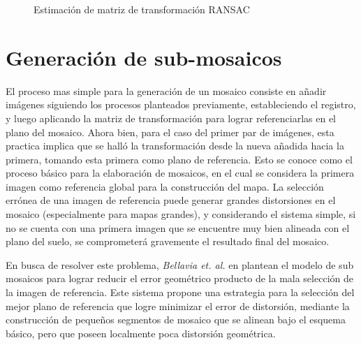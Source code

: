 \begin{figure}[hb]
	\centering
	\begin{minipage}{\linewidth}
		\begin{algorithm}[H] %
			\caption{Estimación de matriz de transformación RANSAC}
			\label{ransac}
			\SetAlgoLined
		\end{algorithm}
	\end{minipage}
\end{figure}



\section{Generación de sub-mosaicos}

El proceso mas simple para la generación de un mosaico consiste en añadir imágenes siguiendo los procesos planteados previamente, estableciendo el registro, y luego aplicando la matriz de transformación para lograr referenciarlas en el plano del mosaico. Ahora bien, para el caso del primer par de imágenes, esta practica implica que se halló la transformación desde la nueva añadida hacia la primera, tomando esta primera como plano de referencia. Esto se conoce como el proceso básico para la elaboración de mosaicos, en el cual se considera la primera imagen como referencia global para la construcción del mapa. La selección errónea de una imagen de referencia puede generar grandes distorsiones en el mosaico (especialmente para mapas grandes), y considerando el sistema simple, si no se cuenta con una primera imagen que se encuentre muy bien alineada con el plano del suelo, se comprometerá gravemente el resultado final del mosaico.

En busca de resolver este problema, \textit{Bellavia et. al.} en \cite{bellavia-ref,bellavia-ransac} plantean el modelo de sub mosaicos para lograr reducir el error geométrico producto de la mala selección de la imagen de referencia. Este sistema propone una estrategia para la selección del mejor plano de referencia que logre minimizar el error de distorsión, mediante la construcción de pequeños segmentos de mosaico que se alinean bajo el esquema básico, pero que poseen localmente poca distorsión geométrica.

